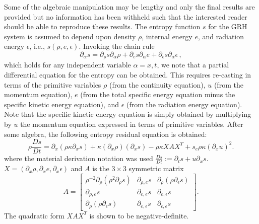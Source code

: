 \documentclass{mc2015}
\begin{document}
Some of the algebraic manipulation may be lengthy and only the final results are provided but no information has been withheld such that the interested
reader should be able to reproduce these results. The entropy function $s$ for the GRH system is assumed to depend upon density $\rho$, internal energy $e$, and radiation 
energy $\epsilon$, i.e., $s( \rho, e, \epsilon)$. Invoking the chain rule
\begin{equation}
\label{eq:app_equ2}
\partial_{\alpha} s = \partial_{\rho} s \partial_{\alpha} \rho +  \partial_{e} s \partial_{\alpha}e +  \partial_{\epsilon} s \partial_{\alpha} \epsilon \,,
\end{equation}
 which holds for any independent variable $\alpha=x,t$, we note that a partial differential equation for the entropy can be obtained. This requires
re-casting   in terms of the primitive variables $\rho$ (from  the continuity equation), $u$  (from  the momentum equation),
$e$ (from the total specific energy equation minus the specific kinetic energy equation), and $\epsilon$ (from the radiation energy equation). Note that 
the specific kinetic energy equation is simply obtained by multiplying by $u$ the momentum equation expressed in terms of primitive variables. After some algebra,
the following entropy residual equation is obtained:
%
\begin{equation} \label{eq:app_entr_eq_non_equil}
\rho \frac{Ds}{Dt} = \partial_x \left( \rho \kappa \partial_x s \right) + \kappa \left(\partial_x \rho\right) \left( \partial_x s\right) - \rho \kappa X A X^T  + s_e \rho \kappa (\partial_x u)^2 .
\end{equation} 
% 
where the material derivation notation was used $\frac{Ds}{Dt} := \partial_t s + u \partial_x s$. $X=\left( \partial_x \rho, \partial_x e, \partial_x \epsilon \right)$ and $A$ is the $3 \times 3$ symmetric matrix
 \begin{equation}
 A = 
 \left[
 \begin{array}{ccc}
\rho^{-2}\partial_{\rho} \left( \rho^2 \partial_{\rho} s \right) & \partial_{\rho,e} s & \partial_{\rho} \left( \rho \partial_{\epsilon} s \right) \\
 \partial_{\rho,e} s & \partial_{e,e} s & \partial_{e,\epsilon} s \\
 \partial_{\rho} \left( \rho \partial_{\epsilon} s \right) & \partial_{e,\epsilon} s & \partial_{\epsilon,\epsilon} s
 \end{array}
 \right] .
 \end{equation}
The quadratic form $ X A X^T$ is shown to be negative-definite.
\end{document}
